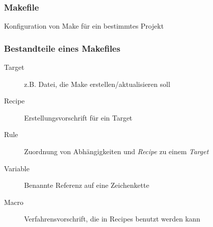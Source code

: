 \begin{frame}
\frametitle{Makefile} Konfiguration von Make für ein bestimmtes Projekt
\end{frame}

\begin{frame}
\frametitle{Bestandteile eines Makefiles}
\begin{description}
	\item[Target] z.B. Datei, die Make erstellen/aktualisieren soll
	\item[Recipe] Erstellungsvorschrift für ein Target
	\item[Rule] Zuordnung von Abhängigkeiten und \emph{Recipe} zu einem \emph{Target}
	\item[Variable] Benannte Referenz auf eine Zeichenkette
	\item[Macro] Verfahrensvorschrift, die in Recipes benutzt werden kann
\end{description}
\end{frame}

